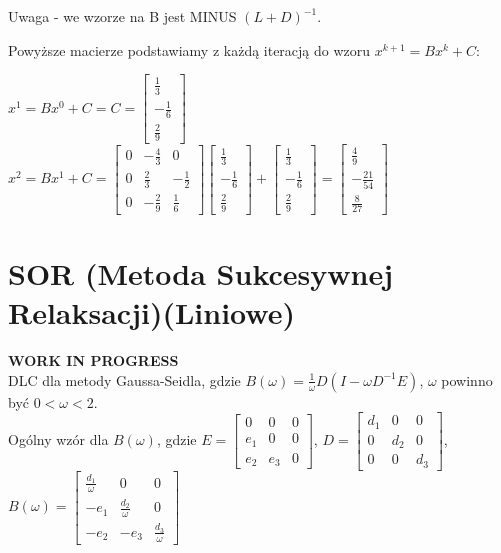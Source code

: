 \documentclass{article}
\begin{document}
Uwaga - we wzorze na B jest MINUS $(L+D)^{-1}$.

Powyższe macierze podstawiamy z każdą iteracją do wzoru $x^{k+1} = Bx^k + C$:

$x^1 = Bx^0 + C = C = \begin{bmatrix}\frac{1}{3}\\-\frac{1}{6}\\\frac{2}{9}\end{bmatrix} $ \\
$x^2 = Bx^1 + C = 
\begin{bmatrix}0 & -\frac{4}{3} & 0 \\0 & \frac{2}{3} & -\frac{1}{2} \\0 & -\frac{2}{9} & \frac{1}{6}\end{bmatrix}
\begin{bmatrix}\frac{1}{3}\\-\frac{1}{6}\\\frac{2}{9}\end{bmatrix}
+ \begin{bmatrix}\frac{1}{3}\\-\frac{1}{6}\\\frac{2}{9}\end{bmatrix}  = \begin{bmatrix}\frac{4}{9}\\-\frac{21}{54}\\\frac{8}{27}\end{bmatrix}$

\section{SOR (Metoda Sukcesywnej Relaksacji)(Liniowe)}
\textbf{WORK IN PROGRESS}\\
DLC dla metody Gaussa-Seidla, gdzie $B(\omega)=\frac{1}{\omega}D(I-\omega D^{-1}E)$, $\omega$ powinno być $0<\omega<2$.\\
Ogólny wzór dla  $B(\omega)$, gdzie $E=\begin{bmatrix} 0 & 0 & 0 \\ e_1 & 0 & 0 \\ e_2 & e_3 & 0 \end{bmatrix}$, $D=\begin{bmatrix} d_1 & 0 & 0 \\ 0 & d_2 & 0 \\ 0 & 0 & d_3 \end{bmatrix}$, $B(\omega) = \begin{bmatrix} \frac{d_1}{\omega} & 0 & 0 \\ -e_1 & \frac{d_2}{\omega} & 0 \\ -e_2 & -e_3 & \frac{d_3}{\omega} \end{bmatrix}$
\end{document}
